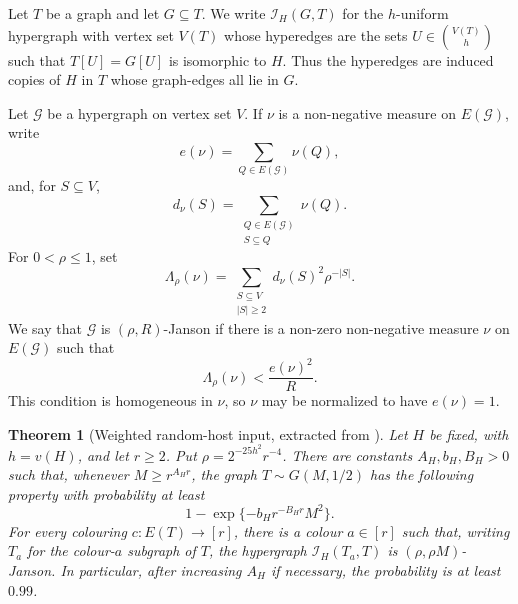 \documentclass[11pt,reqno]{amsart}
\numberwithin{equation}{section}
\theoremstyle{plain}
\newtheorem{theorem}{Theorem}[section]
\theoremstyle{definition}
\newcommand{\calG}{\mathcal G}
\newcommand{\calI}{\mathcal I}
\begin{document}
Let $T$ be a graph and let $G\subseteq T$.  We write
$\calI_H(G,T)$ for the $h$-uniform hypergraph with vertex set $V(T)$ whose
hyperedges are the sets $U\in\binom{V(T)}h$ such that $T[U]=G[U]$ is
isomorphic to $H$.  Thus the hyperedges are induced copies of $H$ in
$T$ whose graph-edges all lie in $G$.

Let $\calG$ be a hypergraph on vertex set $V$.  If $\nu$ is a
non-negative measure on $E(\calG)$, write
$$
        e(\nu)=\sum_{Q\in E(\calG)}\nu(Q),
$$
and, for $S\subseteq V$,
$$
        d_\nu(S)=
        \sum_{\substack{Q\in E(\calG)\\ S\subseteq Q}}\nu(Q).
$$
For $0<\rho\le1$, set
$$
        \Lambda_\rho(\nu)=
        \sum_{\substack{S\subseteq V\\ |S|\ge2}}
        d_\nu(S)^2\rho^{-|S|}.
$$
We say that $\calG$ is $(\rho,R)$-Janson if there is a non-zero
non-negative measure $\nu$ on $E(\calG)$ such that
$$
        \Lambda_\rho(\nu)<\frac{e(\nu)^2}{R}.
$$
This condition is homogeneous in $\nu$, so $\nu$ may be normalized to have
$e(\nu)=1$.


\begin{theorem}[Weighted random-host input, extracted from \cite{ACDFM}]
\label{thm:acdfm-input}
Let $H$ be fixed, with $h=v(H)$, and let $r\ge2$.  Put $\rho=2^{-25h^2}r^{-4}$.
There are constants $A_H,b_H,B_H>0$ such that, whenever $M\ge r^{A_Hr}$, the graph
$T\sim G(M,1/2)$ has the following property with probability at least
$$
        1-\exp\{-b_H r^{-B_Hr}M^2\}.
$$
For every colouring $c:E(T)\to[r]$, there is a colour $a\in[r]$ such that,
writing $T_a$ for the colour-$a$ subgraph of $T$, the hypergraph $ \calI_H(T_a,T)$ is $(\rho,\rho M)$-Janson.  In particular, after increasing $A_H$ if
necessary, the probability is at least $0.99$.
\end{theorem}
\end{document}
